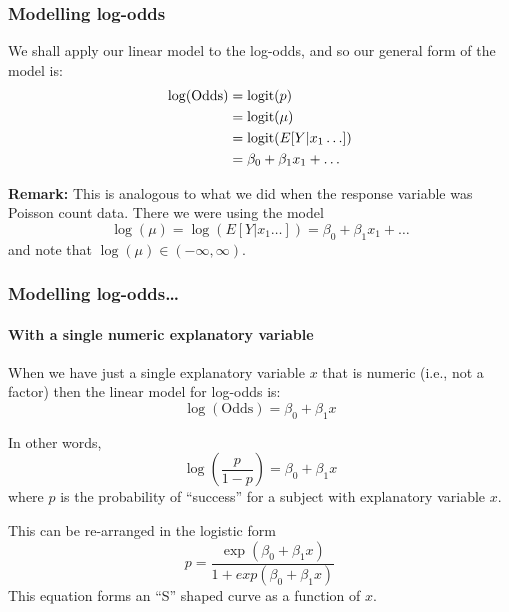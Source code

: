 \documentclass{beamer}\usepackage[]{graphicx}\usepackage[]{xcolor}
\begin{document}
\begin{frame}
\frametitle{Modelling log-odds}
We shall apply our linear model to the log-odds, and so our general form of the model is:
\[
\begin{split}
\log(\text{Odds}) &= \operatorname{logit}(p) \\
                  &= \operatorname{logit}(\mu) \\
                  &= \operatorname{logit}(E[Y|x_1 \ldots]) \\
                  &= \beta_0 + \beta_1 x_1  + \dots  
\end{split}
\]
\bigskip 

{\bf Remark:} This is analogous to what we did when the response variable was Poisson count data.
There we were using the model
\[ \log(\mu) = \log( E[Y|x_1 \ldots] ) = {\beta_0 + \beta_1 x_1 + \dots} \]
and note that $\log(\mu) \in (-\infty,\infty)$.
\end{frame}



\begin{frame}
\frametitle{Modelling log-odds\ldots}
\framesubtitle{With a single numeric explanatory variable}
When we have just a single explanatory variable $x$ that is numeric 
(i.e., not a factor) then the linear model for log-odds is:
\[ \log(\text{Odds}) = \beta_0 + \beta_1 x \]

In other words,
\[ \log \left( \frac{p}{1-p} \right) = \beta_0 + \beta_1 x  \]
where $p$ is the probability of ``success'' for a subject with explanatory variable $x$.

This can be re-arranged in the logistic form
\[ p= \frac{\exp(\beta_0 + \beta_1 x)}{1+exp(\beta_0 + \beta_1 x)} \]
This equation forms an ``S'' shaped curve as a function of $x$.
\end{frame}
\end{document}
